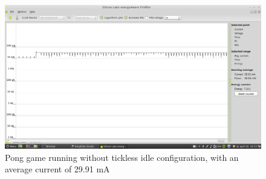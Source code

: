 \begin{figure}[H]
  \centering
  \includegraphics[clip, trim=0cm 0cm 0cm 0cm, width=12cm]{fig/running.png}
  \caption{Pong game running without tickless idle configuration, with an average current of 29.91 mA}
\end{figure}
